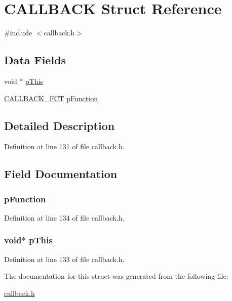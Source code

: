 \hypertarget{a00008}{
\section{CALLBACK Struct Reference}
\label{a00008}
}


{\ttfamily \#include $<$callback.h$>$}

\subsection*{Data Fields}
\begin{DoxyCompactItemize}
\item 
void $\ast$ \hyperlink{a00008_a9603b95573753f229a989062644bdbc3}{pThis}
\item 
\hyperlink{a00466_ab3b2472495860a1aec38b904c5ac0522}{CALLBACK\_\-FCT} \hyperlink{a00008_a4cbbd47ebe1228db59a760f5eeed1f83}{pFunction}
\end{DoxyCompactItemize}


\subsection{Detailed Description}


Definition at line 131 of file callback.h.



\subsection{Field Documentation}
\hypertarget{a00008_a4cbbd47ebe1228db59a760f5eeed1f83}{
\subsubsection[{pFunction}]{ {\bf pFunction}}}
\label{a00008_a4cbbd47ebe1228db59a760f5eeed1f83}


Definition at line 134 of file callback.h.

\hypertarget{a00008_a9603b95573753f229a989062644bdbc3}{
\subsubsection[{pThis}]{\setlength{\rightskip}{0pt plus 5cm}void$\ast$ {\bf pThis}}}
\label{a00008_a9603b95573753f229a989062644bdbc3}


Definition at line 133 of file callback.h.



The documentation for this struct was generated from the following file:\begin{DoxyCompactItemize}
\item 
\hyperlink{a00466}{callback.h}\end{DoxyCompactItemize}
